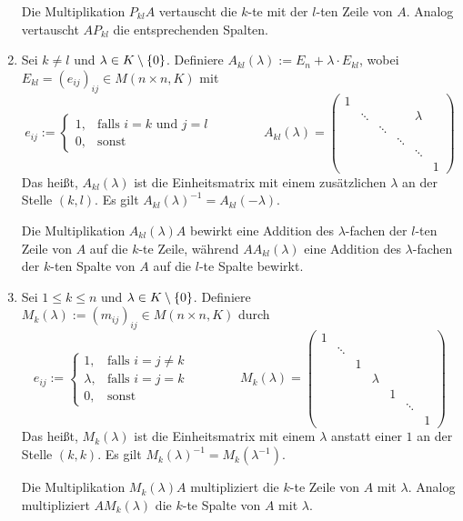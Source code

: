 \begin{definition}[Elementarmatrizen]
\begin{enumerate}[(1)]
		Die Multiplikation $P_{kl} A$ vertauscht die $k$-te mit der $l$-ten Zeile von $A$.
		Analog vertauscht $A P_{kl}$ die entsprechenden Spalten.
		\item Sei $k \neq l$ und $\lambda \in K \setminus \{0\}$.
		Definiere $A_{kl}(\lambda) := E_n + \lambda \cdot E_{kl}$, wobei $E_{kl} = (e_{ij})_{ij} \in M(n \times n,K)$ mit
		\[ e_{ij} := \begin{cases}
			1, & \text{falls } i = k \text{ und } j=l \\
			0, & \text{sonst}
			\end{cases} \qquad \qquad
		A_{kl}(\lambda) =
		\begin{pmatrix}
			1 &  &  &  &  &  \\ 
			& \ddots &  &  & \lambda &  \\ 
			&  & \ddots &  &  &  \\ 
			&  &  & \ddots &  &  \\ 
			&  &  &  & \ddots &  \\ 
			&  &  &  &  & 1
		\end{pmatrix} 
		\]
		Das heißt, $A_{kl}(\lambda)$ ist die Einheitsmatrix mit einem zusätzlichen $\lambda$ an der Stelle $(k,l)$.
		Es gilt $A_{kl}(\lambda)^{-1} = A_{kl}(-\lambda)$.
		
		Die Multiplikation $A_{kl}(\lambda) A$ bewirkt eine Addition des $\lambda$-fachen der $l$-ten Zeile von $A$ auf die $k$-te Zeile, während $A A_{kl}(\lambda)$ eine Addition des $\lambda$-fachen der $k$-ten Spalte von $A$ auf die $l$-te Spalte bewirkt.		
		\item Sei $1 \leq k \leq n$ und $\lambda \in K \setminus \{0\}$. 
		Definiere $M_k(\lambda) := (m_{ij})_{ij} \in M(n \times n,K)$ durch
		\[ e_{ij} := \begin{cases}
			1, & \text{falls } i = j \neq k \\
			\lambda, & \text{falls } i=j=k \\
			0, & \text{sonst}
		\end{cases} \qquad \qquad
		M_{k}(\lambda) =
			\begin{pmatrix}
			1 &  &  &  &  &  &  \\ 
			& \ddots &  &  &  &  &  \\ 
			&  & 1 &  &  &  &  \\ 
			&  &  & \lambda &  &  &  \\ 
			&  &  &  & 1 &  &  \\ 
			&  &  &  &  & \ddots &  \\ 
			&  &  &  &  &  & 1
			\end{pmatrix} 
		\]
		Das heißt, $M_k(\lambda)$ ist die Einheitsmatrix mit einem $\lambda$ anstatt einer $1$ an der Stelle $(k,k)$.
		Es gilt $M_k(\lambda)^{-1} = M_k(\lambda^{-1})$.
		
		Die Multiplikation $M_{k}(\lambda) A$ multipliziert die $k$-te Zeile von $A$ mit $\lambda$.
		Analog multipliziert $A M_{k}(\lambda)$ die $k$-te Spalte von $A$ mit $\lambda$.
	\end{enumerate}
\end{definition}

